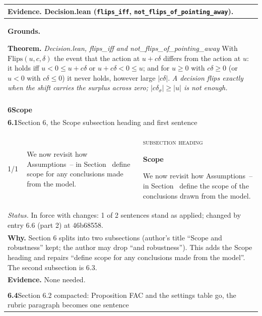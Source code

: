 \documentclass[10pt]{article}
\theoremstyle{definition}
\renewcommand{\ref}[1]{\textsc{\detokenize{#1}}}
\newlength{\fullw}\setlength{\fullw}{25.9cm}
\newcommand{\entryhead}[2]{\multicolumn{3}{|l|}{\rule{0pt}{2.6ex}\large\textbf{#1}\quad #2} \\ \hline}
\begin{document}
{\begin{longtable}{|p{0.9cm}|p{12.2cm}|p{12.2cm}|}
\multicolumn{3}{|p{\fullw}|}{\textbf{Evidence.} Decision.lean (\texttt{flips\_iff}, \texttt{not\_flips\_of\_pointing\_away}).} \\ \hline
\multicolumn{3}{|p{\fullw}|}{\textbf{Grounds.}\par \textbf{Theorem.} \textit{Decision.lean, flips\_iff and not\_flips\_of\_pointing\_away} \newline With $\mathrm{Flips}(u,c,\delta)$ the event that the action at $u+c\delta$ differs from the
action at $u$: it holds iff $u<0\le u+c\delta$ or $u+c\delta<0\le u$; and for $u\ge0$ with
$c\delta\ge0$ (or $u<0$ with $c\delta\le0$) it never holds, however large $|c\delta|$. \newline \textit{A decision flips exactly when the shift carries the surplus across zero; $|c\delta_\sigma|\ge|u|$ is not enough.}} \\ \hline
\multicolumn{3}{|l|}{} \\ \hline
\multicolumn{3}{|l|}{\rule{0pt}{3.2ex}\Large\textbf{6\quad Scope}} \\ \hline\hline
\entryhead{6.1}{Section 6, the Scope subsection heading and first sentence\quad{\footnotesize\textit{(formerly E.15h)}}}
1/1 & We now revisit how Assumptions~\ref{as:localc}--\ref{as:surplus} in Section~\ref{sec:assumptions} define scope for any conclusions made from the model. & \textsc{subsection heading}\par\textbf{\large Scope}\par  \par We now revisit how Assumptions~\ref{as:localc}--\ref{as:surplus} in Section~\ref{sec:assumptions} define the scope of the conclusions drawn from the model. \\ \hline
\multicolumn{3}{|p{\fullw}|}{\textit{Status.} In force with changes: 1 of 2 sentences stand as applied; changed by entry 6.6 (part 2) at 46b68558.} \\ \hline
\multicolumn{3}{|p{\fullw}|}{\textbf{Why.} Section 6 splits into two subsections (author's title ``Scope and robustness'' kept; the author may drop ``and robustness''). This adds the Scope heading and repairs ``define scope for any conclusions made from the model''. The second subsection is 6.3.} \\
\multicolumn{3}{|p{\fullw}|}{\textbf{Evidence.} None needed.} \\ \hline
\multicolumn{3}{|l|}{} \\ \hline
\entryhead{6.4}{Section 6.2 compacted: Proposition FAC and the settings table go, the rubric paragraph becomes one sentence\quad{\footnotesize\textit{(formerly C.18)}}}

\end{longtable}}
\end{document}
